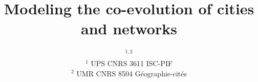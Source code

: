 


\title{Modeling the co-evolution of cities and networks}
\author{$^{1,2}$\\
$^1$ UPS CNRS 3611 ISC-PIF\\
$^2$ UMR CNRS 8504 G{\'e}ographie-cit{\'e}s
}
\date{}


\maketitle

\justify




